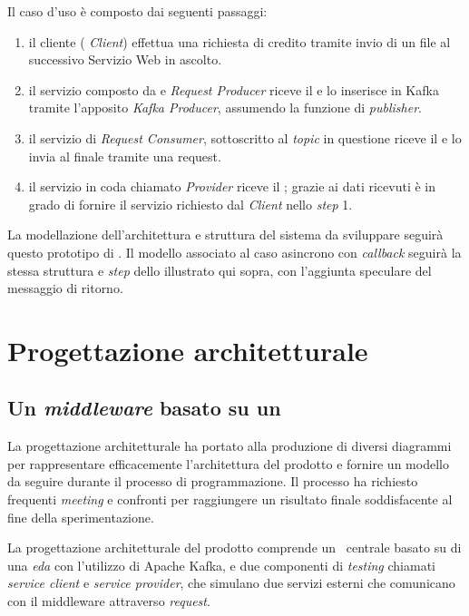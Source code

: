 \noindent
Il caso d'uso è composto dai seguenti passaggi:
\begin{enumerate}
  \item il cliente (\textit{ Client}) effettua una richiesta di credito tramite invio di un file  al successivo Servizio Web in ascolto.
  \item il servizio composto da   e \textit{Request Producer} riceve il  e lo inserisce in Kafka tramite l'apposito \textit{Kafka Producer}, assumendo la funzione di \textit{publisher}.
  \item il servizio di \textit{Request Consumer}, sottoscritto al \textit{topic} in questione riceve il  e lo invia al  finale tramite una  request.
  \item il servizio in coda chiamato  \textit{Provider} riceve il ; grazie ai dati ricevuti è in grado di fornire il servizio richiesto dal \textit{Client} nello \textit{step} 1.
\end{enumerate}

La modellazione dell'architettura e struttura del sistema da sviluppare seguirà questo prototipo di .
Il modello associato al caso asincrono con \textit{callback} seguirà la stessa struttura e \textit{step} dello  illustrato qui sopra, con l'aggiunta speculare del messaggio di ritorno.

\section{Progettazione architetturale}\label{sec:progettazione}
\subsection{Un \textit{middleware} basato su un }

La progettazione architetturale ha portato alla produzione di diversi diagrammi  per rappresentare efficacemente l'architettura del prodotto e fornire un modello da seguire durante il processo di programmazione.
Il processo ha richiesto frequenti \textit{meeting} e confronti per raggiungere un risultato finale soddisfacente al fine della sperimentazione.

La progettazione architetturale del prodotto comprende un \middleware\ centrale basato su di una \textit{\acrlong{eda}} con l'utilizzo di Apache Kafka, e due componenti di \textit{testing} chiamati \textit{service client} e \textit{service provider}, che simulano due servizi esterni che comunicano con il middleware attraverso  \textit{request}.


